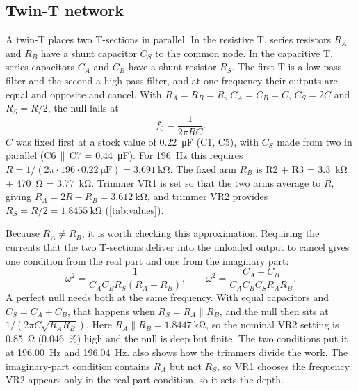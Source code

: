 \documentclass[10pt,letterpaper]{article}
\begin{document}
\subsection{Twin-T network}
A twin-T places two T-sections in parallel. In the resistive T, series resistors $R_A$ and $R_B$ have a shunt capacitor $C_S$ to the common node. In the capacitive T, series capacitors $C_A$ and $C_B$ have a shunt resistor $R_S$. The first T is a low-pass filter and the second a high-pass filter, and at one frequency their outputs are equal and opposite and cancel. With $R_A = R_B = R$, $C_A = C_B = C$, $C_S = 2C$ and $R_S = R/2$, the null falls at
\begin{equation}
  f_0 = \frac{1}{2\pi R C}.
\end{equation}
$C$ was fixed first at a stock value of \SI{0.22}{\micro\farad} (C1, C5), with $C_S$ made from two in parallel (C6\,$\parallel$\,C7 = \SI{0.44}{\micro\farad}). For \SI{196}{\hertz} this requires $R = 1/(2\pi \cdot 196 \cdot \SI{0.22}{\micro\farad}) = \SI{3.691}{\kilo\ohm}$. The fixed arm $R_B$ is R2 + R3 = \SI{3.3}{\kilo\ohm} + \SI{470}{\ohm} = \SI{3.77}{\kilo\ohm}. Trimmer VR1 is set so that the two arms average to $R$, giving $R_A = 2R - R_B = \SI{3.612}{\kilo\ohm}$, and trimmer VR2 provides $R_S = R/2 = \SI{1.8455}{\kilo\ohm}$ (\cref{tab:values}).

Because $R_A \neq R_B$, it is worth checking this approximation. Requiring the currents that the two T-sections deliver into the unloaded output to cancel gives one condition from the real part and one from the imaginary part:
\begin{equation}
  \omega^2 = \frac{1}{C_A C_B R_S (R_A + R_B)}, \qquad
  \omega^2 = \frac{C_A + C_B}{C_A C_B C_S R_A R_B}.
  \label{eq:null}
\end{equation}
A perfect null needs both at the same frequency. With equal capacitors and $C_S = C_A + C_B$, that happens when $R_S = R_A \parallel R_B$, and the null then sits at $1/(2\pi C\sqrt{R_A R_B})$. Here $R_A \parallel R_B = \SI{1.8447}{\kilo\ohm}$, so the nominal VR2 setting is \SI{0.85}{\ohm} (\SI{0.046}{\percent}) high and the null is deep but finite. The two conditions put it at \SI{196.00}{\hertz} and \SI{196.04}{\hertz}.  also shows how the trimmers divide the work. The imaginary-part condition contains $R_A$ but not $R_S$, so VR1 chooses the frequency. VR2 appears only in the real-part condition, so it sets the depth.
\end{document}
